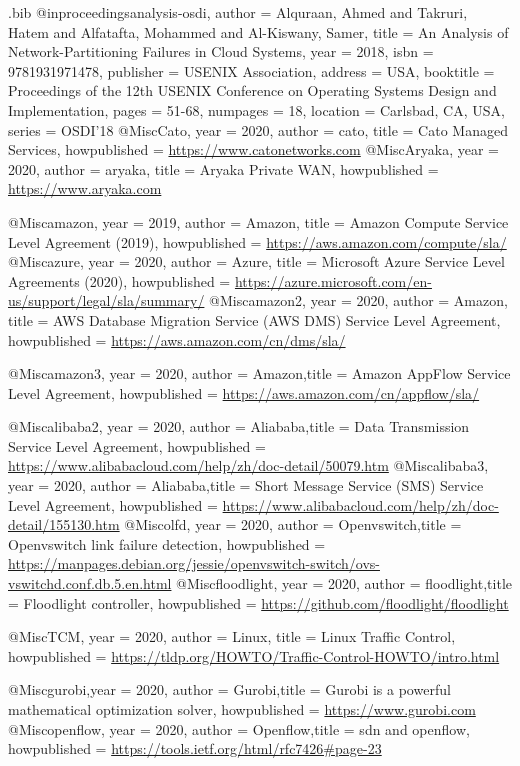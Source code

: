 \documentclass[sigconf]{acmart}
\begin{document}
\begin{filecontents}{\jobname.bib}
@inproceedings{analysis-osdi, author = {Alquraan, Ahmed and Takruri, Hatem and Alfatafta, Mohammed and Al-Kiswany, Samer}, title = {An Analysis of Network-Partitioning Failures in Cloud Systems}, year = {2018}, isbn = {9781931971478}, publisher = {USENIX Association}, address = {USA}, booktitle = {Proceedings of the 12th USENIX Conference on Operating Systems Design and Implementation}, pages = {51-68}, numpages = {18}, location = {Carlsbad, CA, USA}, series = {OSDI'18} }
@Misc{Cato, year = 2020, author = {{cato}}, title = {Cato Managed Services}, howpublished = {\url{https://www.catonetworks.com}}}
@Misc{Aryaka, year = 2020, author = {{aryaka}}, title = {Aryaka Private WAN}, howpublished = {\url{https://www.aryaka.com}}}

@Misc{amazon, year = 2019, author = {{Amazon}}, title = {Amazon Compute Service Level Agreement (2019)}, howpublished = {\url{https://aws.amazon.com/compute/sla/}}}
@Misc{azure, year = 2020, author = {{Azure}}, title = {Microsoft Azure Service Level Agreements (2020)}, howpublished = {\url{https://azure.microsoft.com/en-us/support/legal/sla/summary/}}} 
@Misc{amazon2, year = 2020, author = {{Amazon}}, title = {AWS Database Migration Service (AWS DMS) Service Level Agreement}, howpublished = {\url{https://aws.amazon.com/cn/dms/sla/}}} 

@Misc{amazon3, year = 2020, author = {{Amazon}},title = {Amazon AppFlow Service Level Agreement}, howpublished = {\url{https://aws.amazon.com/cn/appflow/sla/}}} 

@Misc{alibaba2, year = 2020, author = {{Aliababa}},title = {Data Transmission Service Level Agreement}, howpublished = {\url{https://www.alibabacloud.com/help/zh/doc-detail/50079.htm}}} 
@Misc{alibaba3, year = 2020, author = {{Aliababa}},title = {Short Message Service (SMS) Service Level Agreement}, howpublished = {\url{https://www.alibabacloud.com/help/zh/doc-detail/155130.htm}}} 
@Misc{olfd, year = 2020, author = {{Openvswitch}},title = {Openvswitch link failure detection}, howpublished = {\url{https://manpages.debian.org/jessie/openvswitch-switch/ovs-vswitchd.conf.db.5.en.html}}} 
@Misc{floodlight, year = 2020, author = {{floodlight}},title = {Floodlight controller}, howpublished = {\url{https://github.com/floodlight/floodlight}}} 

@Misc{TCM, year = 2020, author = {{Linux}}, title = {Linux Traffic Control}, howpublished = {\url{https://tldp.org/HOWTO/Traffic-Control-HOWTO/intro.html}}} 



@Misc{gurobi,year = 2020, author = {{Gurobi}},title = {Gurobi is a powerful mathematical optimization solver}, howpublished = {\url{https://www.gurobi.com}}}
@Misc{openflow, year = 2020, author = {{Openflow}},title = {sdn and openflow}, howpublished = {\url{https://tools.ietf.org/html/rfc7426\#page-23}}}


\end{filecontents}
\end{document}
